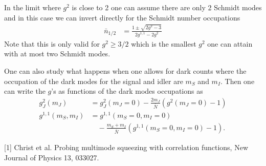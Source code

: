 \documentclass[aps,twocolumn,reprint,nofootinbib]{revtex4-1}
\newcommand{\eq}[1]{\begin{align}#1\end{align}}
\newcommand{\nn}{\nonumber}
\begin{document}
In the limit where $g^2$ is close to 2 one can assume there are only 2 Schmidt modes and in this case we can invert directly for the Schmidt number occupations
\eq{
\bar{n}_{1/2} &= \frac{1 \pm \sqrt{2g^2-3}}{2 g^{1,1}-2 g^2}
}
Note that this is only valid for $g^2 \geq 3/2$ which is the smallest $g^2$ one can attain with at most two Schmidt modes.



One can also study what happens when one allows for dark counts where the occupation of the dark modes for the signal and idler are $m_S$ and $m_I$. Then one can write the $g$'s as functions of the dark modes occupations as
\eq{
g^2_J(m_J) &= g^2_J(m_J=0) - \frac{2 m_J}{\bar{N}}\left(g^2(m_J =0) - 1\right)\\
g^{1,1}(m_S, m_I) &= g^{1,1}(m_S=0, m_I=0) \\
& \quad - \frac{m_S+m_I}{\bar N} \left( g^{1,1}(m_S=0, m_I=0) -1 \right).\nn
}

\bigskip

[1] Christ et al. Probing multimode squeezing with correlation functions, New Journal of Physics 13, 033027.
\end{document}
